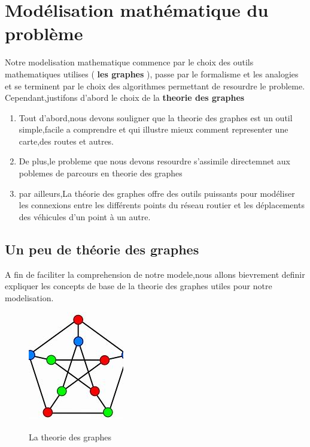 
\section{Modélisation mathématique du problème}
Notre modelisation mathematique commence par le choix des outils mathematiques utilises ( \textbf{les graphes} ),
passe par le formalisme et les analogies et se terminent par le choix des algorithmes permettant de resourdre le probleme.\\

Cependant,justifons d'abord le choix de la \textbf{theorie des graphes}
\begin{enumerate}
    \item Tout d'abord,nous devons souligner que la theorie des graphes est un outil simple,facile a comprendre et qui illustre mieux comment representer une carte,des routes et autres.
    \item De plus,le probleme que nous devons resourdre s'assimile directemnet aux poblemes de parcours en  theorie des graphes
    \item par ailleurs,La théorie des graphes offre des outils puissants pour modéliser les connexions entre les différents points du réseau routier et les déplacements des véhicules d'un point à un autre.
\end{enumerate}




\subsection{Un peu de théorie des graphes}
A fin de faciliter la comprehension de notre modele,nous allons bievrement definir expliquer les concepts de base de la theorie des graphes utiles pour notre modelisation. 

\begin{figure}[h]
    \centering
    \includegraphics[width=0.5\linewidth]{Images/Theory.jpeg}
    \caption{La theorie des graphes}
    \label{fig:un peu de theorie des graphes}
    \cite{graph_image}
\end{figure}


